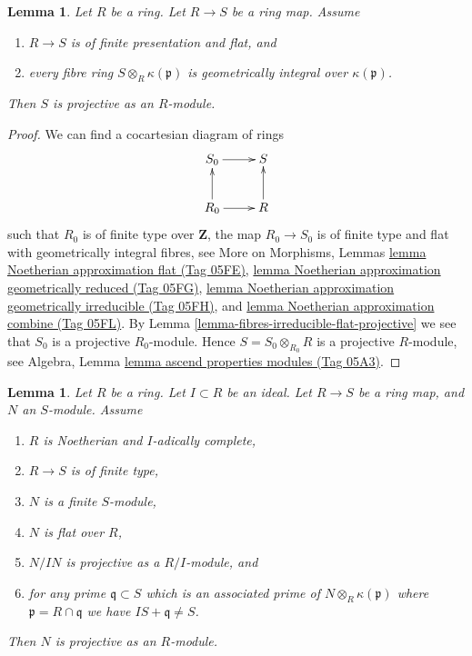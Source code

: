 \documentclass{amsart}
\theoremstyle{plain}
\newtheorem{lemma}[subsection]{Lemma}
\theoremstyle{definition}
\theoremstyle{remark}
\numberwithin{equation}{subsection}
\begin{document}
\begin{lemma}
\label{lemma-fibres-irreducible-flat-projective-nonnoetherian}
Let $R$ be a ring. Let $R \to S$ be a ring map.
Assume
\begin{enumerate}
\item $R \to S$ is of finite presentation and flat, and
\item every fibre ring $S \otimes_R \kappa(\mathfrak p)$ is
geometrically integral over $\kappa(\mathfrak p)$.
\end{enumerate}
Then $S$ is projective as an $R$-module.
\end{lemma}

\begin{proof}
We can find a cocartesian diagram of rings
$$
\xymatrix{
S_0 \ar[r] & S \\
R_0 \ar[u] \ar[r] & R \ar[u]
}
$$
such that $R_0$ is of finite type over $\mathbf{Z}$, the map
$R_0 \to S_0$ is of finite type and flat with geometrically integral
fibres, see
More on Morphisms,
Lemmas \href{https://stacks.math.columbia.edu/tag/05FE}{lemma Noetherian approximation flat (Tag 05FE)},
\href{https://stacks.math.columbia.edu/tag/05FG}{lemma Noetherian approximation geometrically reduced (Tag 05FG)},
\href{https://stacks.math.columbia.edu/tag/05FH}{lemma Noetherian approximation geometrically irreducible (Tag 05FH)},
and \href{https://stacks.math.columbia.edu/tag/05FL}{lemma Noetherian approximation combine (Tag 05FL)}.
By
Lemma \ref{lemma-fibres-irreducible-flat-projective}
we see that $S_0$ is a projective $R_0$-module. Hence $S = S_0 \otimes_{R_0} R$
is a projective $R$-module, see
Algebra, Lemma \href{https://stacks.math.columbia.edu/tag/05A3}{lemma ascend properties modules (Tag 05A3)}.
\end{proof}


\begin{lemma}
\label{lemma-flat-pure-over-complete-projective}
Let $R$ be a ring.
Let $I \subset R$ be an ideal.
Let $R \to S$ be a ring map, and $N$ an $S$-module.
Assume
\begin{enumerate}
\item $R$ is Noetherian and $I$-adically complete,
\item $R \to S$ is of finite type,
\item $N$ is a finite $S$-module,
\item $N$ is flat over $R$,
\item $N/IN$ is projective as a $R/I$-module, and
\item for any prime $\mathfrak q \subset S$ which is an associated prime of
$N \otimes_R \kappa(\mathfrak p)$ where $\mathfrak p = R \cap \mathfrak q$
we have $IS + \mathfrak q \not = S$.
\end{enumerate}
Then $N$ is projective as an $R$-module.
\end{lemma}
\end{document}
